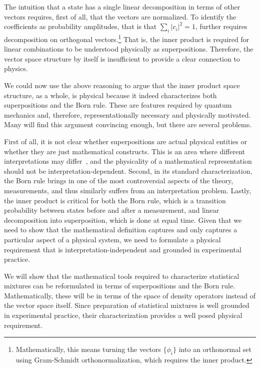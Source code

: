\documentclass[10pt,twocolumn, nofootinbib]{revtex4-2}
\begin{document}
The intuition that a state has a single linear decomposition in terms of other vectors requires, first of all, that the vectors are normalized. To identify the coefficients as probability amplitudes, that is that $\sum_i |c_i|^2 = 1$, further requires decomposition on orthogonal vectors.\footnote{Mathematically, this means turning the vectors $\{\phi_i\}$ into an orthonormal set using Gram-Schmidt orthonormalization, which requires the inner product.} That is, the inner product is required for linear combinations to be understood physically as superpositions. Therefore, the vector space structure by itself is insufficient to provide a clear connection to physics.

We could now use the above reasoning to argue that the inner product space structure, as a whole, is physical because it indeed characterizes both superpositions and the Born rule. These are features required by quantum mechanics and, therefore, representationally necessary and physically motivated. Many will find this argument convincing enough, but there are several problems.

First of all, it is not clear whether superpositions are actual physical entities or whether they are just mathematical constructs. This is an area where different interpretations may differ~\cite{albert_quantum_1994, wallace_everett_2013, howard_complementarity_2021}, and the physicality of a mathematical representation should not be interpretation-dependent. Second, in its standard characterization, the Born rule brings in one of the most controversial aspects of the theory, measurements, and thus similarly suffers from an interpretation problem. Lastly, the inner product is critical for both the Born rule, which is a transition probability between states before and after a measurement, and linear decomposition into superposition, which is done at equal time. Given that we need to show that the mathematical definition captures and only captures a particular aspect of a physical system, we need to formulate a physical requirement that is interpretation-independent and grounded in experimental practice.

We will show that the mathematical tools required to characterize statistical mixtures can be reformulated in terms of superpositions and the Born rule. Mathematically, these will be in terms of the space of density operators instead of the vector space itself. Since preparation of statistical mixtures is well grounded in experimental practice, their characterization provides a well posed physical requirement.
\end{document}
